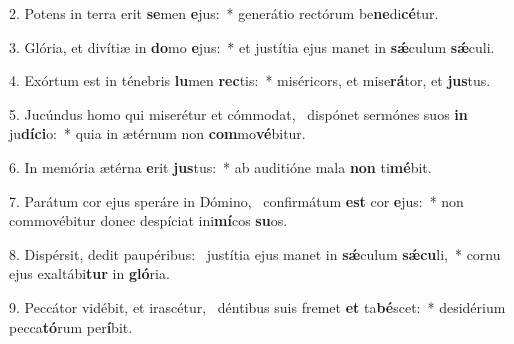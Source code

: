 2. Potens in terra erit \textbf{se}men \textbf{e}jus:~*  generátio rectórum be\textbf{ne}di\textbf{cé}tur.\

3. Glória, et divítiæ in \textbf{do}mo \textbf{e}jus:~*  et justítia ejus manet in \textbf{sǽ}culum \textbf{sǽ}culi.\

4. Exórtum est in ténebris \textbf{lu}men \textbf{rec}tis:~*  miséricors, et mise\textbf{rá}tor, et \textbf{jus}tus.\

5. Jucúndus homo qui miserétur et cómmodat, \dag\  dispónet sermónes suos \textbf{in} ju\textbf{dí}\textbf{ci}o:~*  quia in ætérnum non \textbf{com}mo\textbf{vé}bitur.\

6. In memória ætérna \textbf{e}rit \textbf{jus}tus:~*  ab auditióne mala \textbf{non} ti\textbf{mé}bit.\

7. Parátum cor ejus speráre in Dómino, \dag\  confirmátum \textbf{est} cor \textbf{e}jus:~*  non commovébitur donec despíciat ini\textbf{mí}cos \textbf{su}os.\

8. Dispérsit, dedit paupéribus: \dag\  justítia ejus manet in \textbf{sǽ}culum \textbf{sǽ}\textbf{cu}li,~*  cornu ejus exaltábi\textbf{tur} in \textbf{gló}ria.\

9. Peccátor vidébit, et irascétur, \dag\  déntibus suis fremet \textbf{et} ta\textbf{bé}scet:~*  desidérium pecca\textbf{tó}rum per\textbf{í}bit.\


